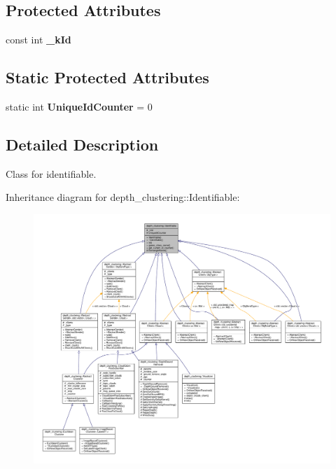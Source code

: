 \subsection*{Protected Attributes}
\begin{DoxyCompactItemize}
\item 
\hypertarget{classdepth__clustering_1_1Identifiable_a82e9edccdd02896f9bcd2fa829645158}{const int {\bfseries \-\_\-k\-Id}}\label{classdepth__clustering_1_1Identifiable_a82e9edccdd02896f9bcd2fa829645158}

\end{DoxyCompactItemize}
\subsection*{Static Protected Attributes}
\begin{DoxyCompactItemize}
\item 
\hypertarget{classdepth__clustering_1_1Identifiable_ac467cc001b2e67e09a10c7dc0da96c4c}{static int {\bfseries Unique\-Id\-Counter} = 0}\label{classdepth__clustering_1_1Identifiable_ac467cc001b2e67e09a10c7dc0da96c4c}

\end{DoxyCompactItemize}


\subsection{Detailed Description}
Class for identifiable. 

Inheritance diagram for depth\-\_\-clustering\-:\-:Identifiable\-:
\nopagebreak
\begin{figure}[H]
\begin{center}
\leavevmode
\includegraphics[width=350pt]{classdepth__clustering_1_1Identifiable__inherit__graph}
\end{center}
\end{figure}


